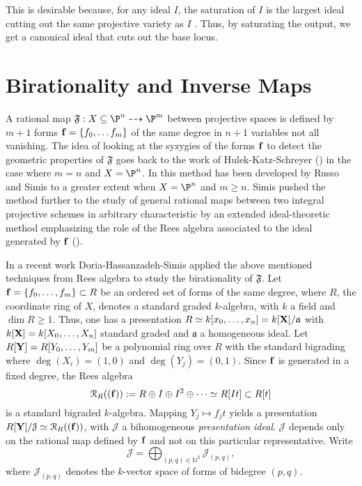\documentclass[12pt]{amsart}
\numberwithin{equation}{theorem}
\def\ff{{\bf f}}
\def\XX{{\bf X}}
\def\YY{{\bf Y}}
\renewcommand{\:}{\colon}
\theoremstyle{theorem}
\begin{document}
This is desirable because, for any ideal $I$, the saturation of $I$ is the largest ideal cutting out the same projective variety as $I$ \cite[II.5 exercise whatever]{Hartshorne}. Thus, by saturating the output, we get a canonical ideal that cuts out the base locus. 

\section{Birationality and Inverse Maps}
A rational map $\mathfrak{F}:X\subseteq \P^n\dasharrow \P^m$ between projective
spaces is defined by $m+1$ forms $\ff=\{f_0,\ldots f_m\}$
of the same degree in $n+1$ variables not all vanishing.
The idea of looking at the syzygies of the forms $\ff$ to detect the geometric properties of  $\mathfrak{F}$ goes
back to the work of Hulek-Katz-Schreyer (\cite{HulekKatzSchreyer}) in the case
where $m=n$ and $X=\P^n$. In \cite{RussoSimisComposito}  this method has been developed by Russo and Simis 
to a greater extent when $X=\P^n$ and $m\geq n$. Simis pushed the method further to the study
of general rational maps between two integral projective schemes in
arbitrary characteristic by an extended ideal-theoretic method
emphasizing the role of the Rees algebra associated to the ideal
generated by $\ff$ (\cite{SimisCremona}).

In a recent work Doria-Hassanzadeh-Simis \cite{DoriaHassanzadehSimisBirationality} applied the above mentioned 
 techniques from Rees algebra to study the birationality of  $\mathfrak{F}$. 
Let $\ff=\{f_0,\ldots,f_m\}\subset R$ be an ordered set of forms of the same degree,
where $R$, the coordinate ring of $X$,  denotes a standard graded $k$-algebra, with $k$ a field and $\dim R\geq 1$.
Thus, one has a presentation $R\simeq k[x_0,\ldots, x_n]=k[\XX]/\mathfrak{a}$ with $k[\XX]=k[X_0,\ldots, X_n]$
standard graded and $\mathfrak{a}$ a homogeneous ideal.
Let $R[\YY]=R[Y_0,\ldots,Y_m]$ be a polynomial ring over $R$ with the standard bigrading
where $\deg(X_i)=(1,0)$ and $\deg(Y_j)=(0,1)$.
Since $\ff$ is generated in a fixed degree, the Rees algebra
$${\mathcal R}_R((\ff)):=R\oplus I\oplus I^2\oplus \cdots \simeq R[It]\subset R[t]$$
is a standard bigraded $k$-algebra. Mapping $Y_j\mapsto f_jt$ yields
a presentation $R[\YY]/\mathcal{J}\simeq {\mathcal R}_R((\ff))$, with $\mathcal{J}$ a bihomogeneous {\em presentation
ideal}.
$\mathcal{J}$ depends only on the rational map defined by $\ff$
and not on this particular representative.
Write
$${\mathcal J}=\bigoplus_{(p,q)\in \mathbb{N}^2} {\mathcal J}_{(p,q)},$$
where ${\mathcal J}_{(p,q)}$ denotes the $k$-vector space of forms of bidegree $(p,q)$.
\end{document}
